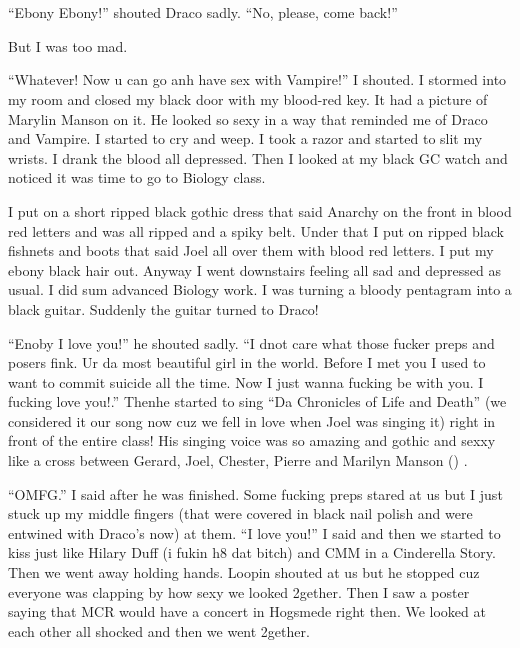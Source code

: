 \section{}



\enquote{Ebony Ebony!} shouted Draco sadly. \enquote{No, please, come back!}

But I was too mad.

\begin{sloppypar}
    \enquote{Whatever! Now u can go anh have sex with Vampire!} I shouted. I stormed into my room and closed my black door with my blood-red key. It had a picture of Marylin Manson on it. He looked so sexy in a way that reminded me of Draco and Vampire. I started to cry and weep. I took a razor and started to slit my wrists. I drank the blood all depressed. Then I looked at my black GC watch and noticed it was time to go to Biology class.    
\end{sloppypar}

I put on a short ripped black gothic dress that said Anarchy on the front in blood red letters and was all ripped and a spiky belt. Under that I put on ripped black fishnets and boots that said Joel all over them with blood red letters. I put my ebony black hair out. Anyway I went downstairs feeling all sad and depressed as usual. I did sum advanced Biology work. I was turning a bloody pentagram into a black guitar. Suddenly the guitar turned to Draco!

\enquote{Enoby I love you!} he shouted sadly. \enquote{I dnot care what those fucker preps and posers fink. Ur da most beautiful girl in the world. Before I met you I used to want to commit suicide all the time. Now I just wanna fucking be with you. I fucking love you!.} Then\dotfill he started to sing \enquote{Da Chronicles of Life and Death} (we considered it our song now cuz we fell in love when Joel was singing it) right in front of the entire class! His singing voice was so amazing and gothic and sexxy like a cross between Gerard, Joel, Chester, Pierre and Marilyn Manson () .

\enquote{OMFG.} I said after he was finished. Some fucking preps stared at us but I just stuck up my middle fingers (that were covered in black nail polish and were entwined with Draco's now) at them. \enquote{I love you!} I said and then we started to kiss just like Hilary Duff (i fukin h8 dat bitch) and CMM in a Cinderella Story. Then we went away holding hands. Loopin shouted at us but he stopped cuz everyone was clapping by how sexy we looked 2gether. Then I saw a poster saying that MCR would have a concert in Hogsmede right then. We looked at each other all shocked and then we went 2gether.
